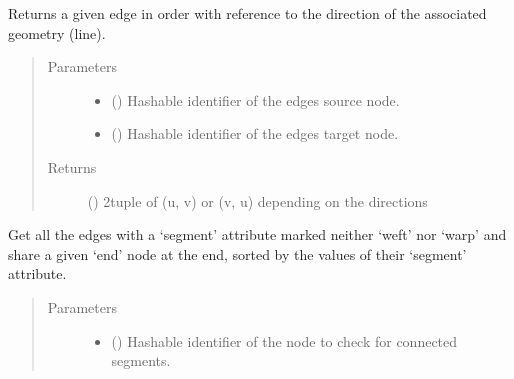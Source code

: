 \documentclass[letterpaper,10pt,english]{sphinxmanual}
\begin{document}
\begin{fulllineitems}
\begin{fulllineitems}
\label{\detokenize{cockatoo:cockatoo.KnitNetworkBase.edge_geometry_direction}}
Returns a given edge in order with reference to the direction of the
associated geometry (line).
\begin{quote}\begin{description}
\item[{Parameters}] \leavevmode\begin{itemize}
\item {} 
 () \textendash{} Hashable identifier of the edges source node.

\item {} 
 () \textendash{} Hashable identifier of the edges target node.

\end{itemize}

\item[{Returns}] \leavevmode
{} () \textendash{} 2\sphinxhyphen{}tuple of (u, v) or (v, u) depending on the directions

\end{description}\end{quote}

\end{fulllineitems}


\begin{fulllineitems}
\label{\detokenize{cockatoo:cockatoo.KnitNetworkBase.end_node_segments_by_end}}
Get all the edges with a ‘segment’ attribute marked neither ‘weft’ nor
‘warp’ and share a given ‘end’ node at the end, sorted by the values
of their ‘segment’ attribute.
\begin{quote}\begin{description}
\item[{Parameters}] \leavevmode\begin{itemize}
\item {} 
 () \textendash{} Hashable identifier of the node to check for connected segments.


\end{itemize}
\end{description}
\end{quote}
\end{fulllineitems}
\end{fulllineitems}
\end{document}
